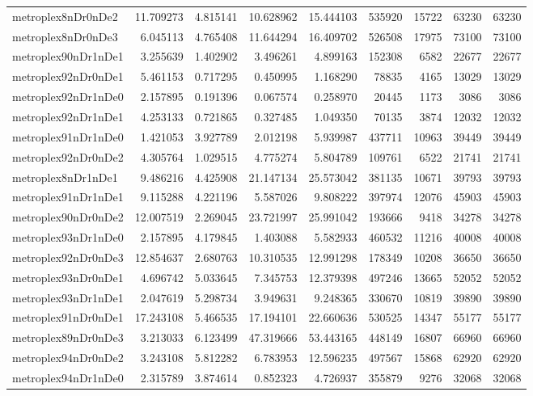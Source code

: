 \begin{longtable}{|l|r|r|r|r|r|r|r|r|}
metroplex8nDr0nDe2 & 11.709273 & 4.815141 & 10.628962 & 15.444103 & 535920 & 15722 & 63230 & 63230 \\
metroplex8nDr0nDe3 & 6.045113 & 4.765408 & 11.644294 & 16.409702 & 526508 & 17975 & 73100 & 73100 \\
metroplex90nDr1nDe1 & 3.255639 & 1.402902 & 3.496261 & 4.899163 & 152308 & 6582 & 22677 & 22677 \\
metroplex92nDr0nDe1 & 5.461153 & 0.717295 & 0.450995 & 1.168290 & 78835 & 4165 & 13029 & 13029 \\
metroplex92nDr1nDe0 & 2.157895 & 0.191396 & 0.067574 & 0.258970 & 20445 & 1173 & 3086 & 3086 \\
metroplex92nDr1nDe1 & 4.253133 & 0.721865 & 0.327485 & 1.049350 & 70135 & 3874 & 12032 & 12032 \\
metroplex91nDr1nDe0 & 1.421053 & 3.927789 & 2.012198 & 5.939987 & 437711 & 10963 & 39449 & 39449 \\
metroplex92nDr0nDe2 & 4.305764 & 1.029515 & 4.775274 & 5.804789 & 109761 & 6522 & 21741 & 21741 \\
metroplex8nDr1nDe1 & 9.486216 & 4.425908 & 21.147134 & 25.573042 & 381135 & 10671 & 39793 & 39793 \\
metroplex91nDr1nDe1 & 9.115288 & 4.221196 & 5.587026 & 9.808222 & 397974 & 12076 & 45903 & 45903 \\
metroplex90nDr0nDe2 & 12.007519 & 2.269045 & 23.721997 & 25.991042 & 193666 & 9418 & 34278 & 34278 \\
metroplex93nDr1nDe0 & 2.157895 & 4.179845 & 1.403088 & 5.582933 & 460532 & 11216 & 40008 & 40008 \\
metroplex92nDr0nDe3 & 12.854637 & 2.680763 & 10.310535 & 12.991298 & 178349 & 10208 & 36650 & 36650 \\
metroplex93nDr0nDe1 & 4.696742 & 5.033645 & 7.345753 & 12.379398 & 497246 & 13665 & 52052 & 52052 \\
metroplex93nDr1nDe1 & 2.047619 & 5.298734 & 3.949631 & 9.248365 & 330670 & 10819 & 39890 & 39890 \\
metroplex91nDr0nDe1 & 17.243108 & 5.466535 & 17.194101 & 22.660636 & 530525 & 14347 & 55177 & 55177 \\
metroplex89nDr0nDe3 & 3.213033 & 6.123499 & 47.319666 & 53.443165 & 448149 & 16807 & 66960 & 66960 \\
metroplex94nDr0nDe2 & 3.243108 & 5.812282 & 6.783953 & 12.596235 & 497567 & 15868 & 62920 & 62920 \\
metroplex94nDr1nDe0 & 2.315789 & 3.874614 & 0.852323 & 4.726937 & 355879 & 9276 & 32068 & 32068 \\

\end{longtable}
